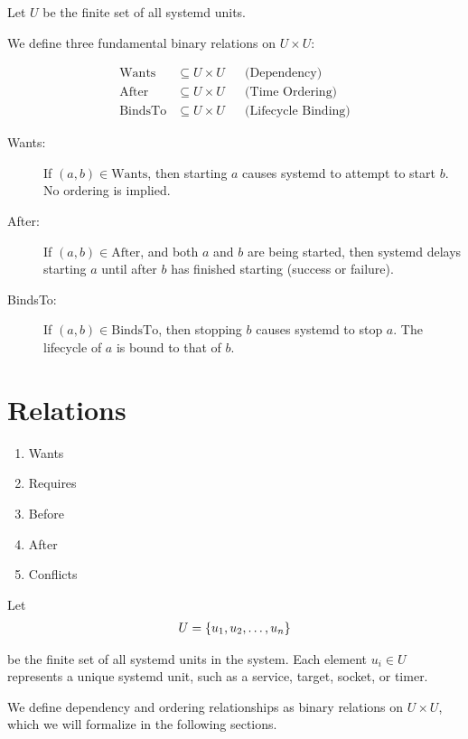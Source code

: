 \documentclass[openany, 12pt]{book}
\begin{document}
Let $U$ be the finite set of all systemd units.

We define three fundamental binary relations on $U \times U$:

\begin{align*}
	\text{Wants}   & \subseteq U \times U &  & \text{(Dependency)}        \\
	\text{After}   & \subseteq U \times U &  & \text{(Time Ordering)}     \\
	\text{BindsTo} & \subseteq U \times U &  & \text{(Lifecycle Binding)}
\end{align*}

\begin{description}
	\item[Wants:] If $(a, b) \in \text{Wants}$, then starting $a$ causes systemd
	      to attempt to start $b$. No ordering is implied.

	\item[After:] If $(a, b) \in \text{After}$, and both $a$ and $b$ are being
	      started, then systemd delays starting $a$ until after $b$ has finished
	      starting (success or failure).

	\item[BindsTo:] If $(a, b) \in \text{BindsTo}$, then stopping $b$ causes
	      systemd to stop $a$. The lifecycle of $a$ is bound to that of $b$.
\end{description}


\chapter{Relations}
\begin{enumerate}[label = {(\arabic*)}]
	\item Wants
	\item Requires
	\item Before
	\item After
	\item Conflicts
\end{enumerate}

Let
\begin{align*}
	U = \{u_1, u_2, \dots, u_n\}
\end{align*}

be the finite set of all systemd units in the system. Each element $u_i \in U$
represents a unique systemd unit, such as a service, target, socket, or timer.

We define dependency and ordering relationships as binary relations on $U
	\times U$, which we will formalize in the following sections.
\end{document}
